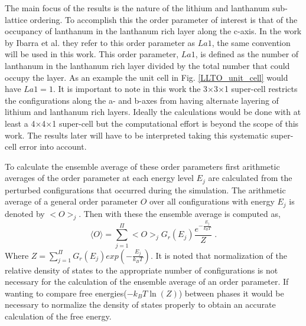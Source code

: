 \documentclass[aps,pre,reprint,superscriptaddress,showkeys]{revtex4-2}
\begin{document}
The main focus of the results is the nature of the lithium and lanthanum sub-lattice ordering. To accomplish this the order parameter of interest is that of the occupancy of lanthanum in the lanthanum rich layer along the c-axis.  In the work by Ibarra et al. \cite{P4mmmstrucuture} they refer to this order parameter as $La1$, the same convention will be used in this work. This order parameter, $La1$, is defined as the number of lanthanum in the lanthanum rich layer divided by the total number that could occupy the layer. As an example the unit cell in Fig. \ref{LLTO_unit_cell} would have $La1=1$. It is important to note in this work the 3$\times$3$\times$1 super-cell restricts the configurations along the a- and b-axes from having alternate layering of lithium and lanthanum rich layers. Ideally the calculations would be done with at least a 4$\times$4$\times$1 super-cell but the computational effort is beyond the scope of this work. The results later will have to be interpreted taking this systematic super-cell error into account. 
 

  
To calculate the ensemble average of these order parameters first arithmetic averages of the order parameter at each energy level $E_j$ are calculated from the perturbed configurations  that occurred during the simulation. The arithmetic average of a general order parameter $O$ over all configurations with energy $E_j$ is denoted by $< O >_j$. Then with these the ensemble average is computed as, 
  \begin{equation}
  \langle O \rangle  =  \sum_{j=1}^{\Pi}< O >_j G_r(E_j) \frac{e^{-\frac{E_j}{k_BT}}}{Z} \;.
  \label{ensembleaverage}
  \end{equation}
  Where $Z= \sum_{j=1}^{\Pi} G_r(E_j) exp(-\frac{E_j}{k_BT})$. 
It is noted that normalization of the relative density of states to the appropriate number of configurations is not necessary for the calculation of the ensemble average of an order parameter. If wanting to compare free energies($-k_BT\ln(Z)$) between phases it would be necessary to normalize the density of states properly to obtain an accurate calculation of the free energy. 
\end{document}
